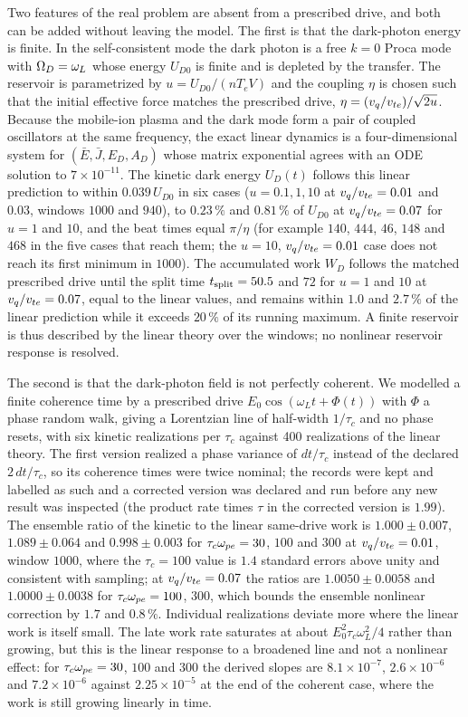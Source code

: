 Two features of the real problem are absent from a prescribed drive, and both can be added without leaving the model. The first is that the dark-photon energy is finite. In the self-consistent mode the dark photon is a free $k=0$ Proca mode with $\Omega_D=\omega_L$ whose energy $U_{D0}$ is finite and is depleted by the transfer. The reservoir is parametrized by $u=U_{D0}/(nT_eV)$ and the coupling $\eta$ is chosen such that the initial effective force matches the prescribed drive, $\eta=(v_q/v_{te})/\sqrt{2u}$. Because the mobile-ion plasma and the dark mode form a pair of coupled oscillators at the same frequency, the exact linear dynamics is a four-dimensional system for $(\bar E,\bar J,E_D,A_D)$ whose matrix exponential agrees with an ODE solution to $7\times10^{-11}$. The kinetic dark energy $U_D(t)$ follows this linear prediction to within $0.039\,U_{D0}$ in six cases ($u=0.1,1,10$ at $v_q/v_{te}=0.01$ and $0.03$, windows $1000$ and $940$), to $0.23\,\%$ and $0.81\,\%$ of $U_{D0}$ at $v_q/v_{te}=0.07$ for $u=1$ and $10$, and the beat times equal $\pi/\eta$ (for example $140$, $444$, $46$, $148$ and $468$ in the five cases that reach them; the $u=10$, $v_q/v_{te}=0.01$ case does not reach its first minimum in $1000$). The accumulated work $W_D$ follows the matched prescribed drive until the split time $t_{\rm split}=50.5$ and $72$ for $u=1$ and $10$ at $v_q/v_{te}=0.07$, equal to the linear values, and remains within $1.0$ and $2.7\,\%$ of the linear prediction while it exceeds $20\,\%$ of its running maximum. A finite reservoir is thus described by the linear theory over the windows; no nonlinear reservoir response is resolved.


The second is that the dark-photon field is not perfectly coherent. We modelled a finite coherence time by a prescribed drive $E_0\cos(\omega_Lt+\Phi(t))$ with $\Phi$ a phase random walk, giving a Lorentzian line of half-width $1/\tau_c$ and no phase resets, with six kinetic realizations per $\tau_c$ against 400 realizations of the linear theory. The first version realized a phase variance of $dt/\tau_c$ instead of the declared $2\,dt/\tau_c$, so its coherence times were twice nominal; the records were kept and labelled as such and a corrected version was declared and run before any new result was inspected (the product rate times $\tau$ in the corrected version is $1.99$). The ensemble ratio of the kinetic to the linear same-drive work is $1.000\pm0.007$, $1.089\pm0.064$ and $0.998\pm0.003$ for $\tau_c\omega_{pe}=30$, $100$ and $300$ at $v_q/v_{te}=0.01$, window $1000$, where the $\tau_c=100$ value is $1.4$ standard errors above unity and consistent with sampling; at $v_q/v_{te}=0.07$ the ratios are $1.0050\pm0.0058$ and $1.0000\pm0.0038$ for $\tau_c\omega_{pe}=100$, $300$, which bounds the ensemble nonlinear correction by $1.7$ and $0.8\,\%$. Individual realizations deviate more where the linear work is itself small. The late work rate saturates at about $E_0^2\tau_c\omega_L^2/4$ rather than growing, but this is the linear response to a broadened line and not a nonlinear effect: for $\tau_c\omega_{pe}=30$, $100$ and $300$ the derived slopes are $8.1\times10^{-7}$, $2.6\times10^{-6}$ and $7.2\times10^{-6}$ against $2.25\times10^{-5}$ at the end of the coherent case, where the work is still growing linearly in time.

